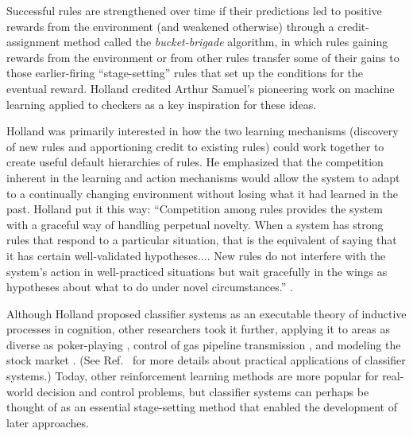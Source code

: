 \documentclass{sig-alternate}
\begin{document}
Successful rules are strengthened over time if their predictions led
to positive rewards from the environment (and weakened otherwise)
through a credit-assignment method called the \emph{bucket-brigade}
algorithm, in which rules gaining rewards from the environment or from
other rules transfer some of their gains to those earlier-firing
``stage-setting'' rules that set up the conditions for the eventual
reward. Holland credited Arthur Samuel's pioneering work on machine
learning applied to checkers \cite{Samuel1959} as a key inspiration for these ideas.


Holland was primarily interested in how the two
learning mechanisms (discovery of new rules and apportioning credit to
existing rules) could work together to create 
useful default hierarchies of rules.  He emphasized that the
competition inherent in the learning and action mechanisms would allow
the system to adapt to a continually changing environment without
losing what it had learned in the past.  Holland put it this way:
``Competition among rules provides the system with a graceful way of
handling perpetual novelty.  When a system has strong rules that
respond to a particular situation, that is the equivalent of saying
that it has certain well-validated hypotheses.... New rules do not
interfere with the system's action in well-practiced situations but
wait gracefully in the wings as hypotheses about what to do under
novel circumstances.'' \cite{Holland1992}.

Although Holland proposed classifier systems as 
an executable theory of inductive processes in cognition, other researchers took it further, 
applying it to areas as diverse
as poker-playing \cite{Smith1980}, control of gas pipeline
transmission \cite{Goldberg1983}, and modeling the stock market
\cite{Palmer1994}.  (See Ref.~\cite{Booker1989} for more details about
practical applications of classifier systems.)  Today, other
reinforcement learning methods are more popular for real-world
decision and control problems, but classifier systems can perhaps be
thought of as an essential stage-setting method that enabled the
development of later approaches.
\end{document}
